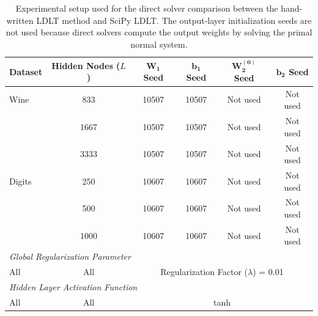 \begin{table}[ht]
\centering
\begin{tabular}{lccccc}
\hline
\textbf{Dataset} & \textbf{Hidden Nodes ($L$)} & $\boldsymbol{W_1}$ \textbf{Seed} & $\boldsymbol{b_1}$ \textbf{Seed} & $\boldsymbol{W_2^{(0)}}$ \textbf{Seed} & $\boldsymbol{b_2}$ \textbf{Seed} \\
\hline
Wine & 833  & 10507 & 10507 & Not used & Not used \\
     & 1667 & 10507 & 10507 & Not used & Not used \\
     & 3333 & 10507 & 10507 & Not used & Not used \\
\hline
Digits & 250  & 10607 & 10607 & Not used & Not used \\
       & 500  & 10607 & 10607 & Not used & Not used \\
       & 1000 & 10607 & 10607 & Not used & Not used \\
\hline
\multicolumn{6}{l}{\textit{Global Regularization Parameter}} \\
\hline
All & All & \multicolumn{4}{c}{Regularization Factor ($\lambda$) = 0.01} \\
\hline
\multicolumn{6}{l}{\textit{Hidden Layer Activation Function}} \\
\hline
All & All & \multicolumn{4}{c}{tanh} \\
\hline
\end{tabular}
\caption{Experimental setup used for the direct solver comparison between the hand-written LDLT method and SciPy LDLT. The output-layer initialization seeds are not used because direct solvers compute the output weights by solving the primal normal system.}
\label{tab:direct_solvers_experiment_setup}
\end{table}
